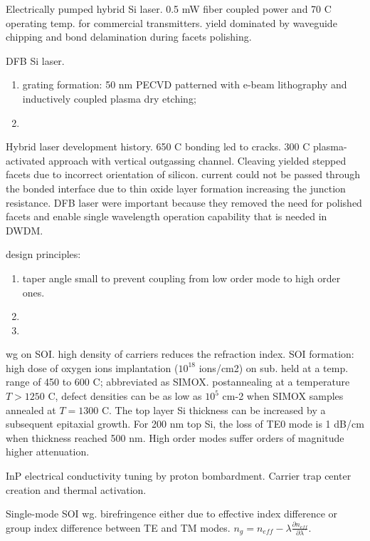 Electrically pumped hybrid Si laser.\cite{Fang2006} 0.5 mW fiber coupled power and 70 C operating temp. for commercial transmitters. yield dominated by waveguide chipping and bond delamination during facets polishing. 

DFB Si laser.\cite{Fang2008} 

\begin{enumerate}
\item grating formation: 50 nm PECVD  patterned with e-beam lithography and inductively coupled plasma dry etching; 
\item 
\end{enumerate}

Hybrid laser development history.\cite{Bowers2010} 650 C bonding led to cracks. 300 C plasma-activated approach with vertical outgassing channel. Cleaving yielded stepped facets due to incorrect orientation of silicon. current could not be passed through the bonded interface due to thin oxide layer formation increasing the junction resistance. DFB laser were important because they removed the need for polished facets and enable single wavelength operation capability that is needed in DWDM. 


design principles:
\begin{enumerate}
\item taper angle small to prevent coupling from low order mode to high order ones.
\item 
\item 
\end{enumerate}

wg on SOI.\cite{Kurdi1988} high density of carriers reduces the refraction index. SOI formation: high dose of oxygen ions implantation ($10^{18}$ ions/cm2) on sub. held at a temp. range of 450 to 600 C; abbreviated as SIMOX. postannealing at a temperature $T>1250$ C, defect densities can be as low as $10^5$ cm-2 when SIMOX samples annealed at $T=1300$ C. The top layer Si thickness can be increased by a subsequent epitaxial growth. For 200 nm top Si, the loss of TE0 mode is 1 dB/cm when  thickness reached 500 nm. High order modes suffer orders of magnitude higher attenuation. 

InP electrical conductivity tuning by proton bombardment.\cite{Boudinov2001} Carrier trap center creation and thermal activation. 

Single-mode SOI wg.\cite{Vivien2002} birefringence either due to effective index difference or group index difference between TE and TM modes. $n_g = n_{eff} - \lambda \frac{\partial n_{eff}}{\partial\lambda}$. 

